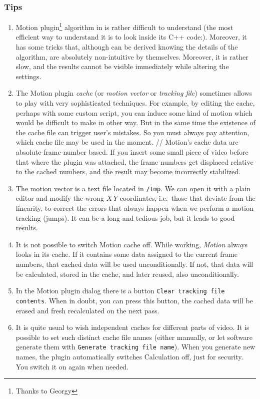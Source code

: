 \subsubsection*{Tips}
\label{ssub:tips}

\begin{enumerate}
    \item Motion plugin\protect\footnote{Thanks to Georgy} algorithm in \CGG{} is rather difficult to understand (the most efficient way to understand it is to look inside its C++ code:). Moreover, it has some tricks that, although can be derived knowing the details of the algorithm, are absolutely non-intuitive by themselves. Moreover, it is rather slow, and the results cannot be visible immediately while altering the settings.
    \item The Motion plugin \textit{cache} (or\textit{ motion vector} or \textit{tracking file}) sometimes allows to play with very sophisticated techniques. For example, by editing the cache, perhaps with some custom script, you can induce some kind of motion which would be difficult to make in other way. But in the same time the existence of the cache file can trigger user's mistakes. So you must always pay attention, which cache file may be used in the moment. //
    Motion's cache data are absolute-frame-number based. If you insert some small piece of video before that where the plugin was attached, the frame numbers get displaced relative to the cached numbers, and the result may become incorrectly stabilized.
    \item The motion vector is a text file located in \texttt{/tmp}. We can open it with a plain editor and modify the wrong $X\,Y$ coordinates, i.e.\ those that deviate from the linearity, to correct the errors that always happen when we perform a motion tracking (jumps). It can be a long and tedious job, but it leads to good results.
    \item It is not possible to switch Motion cache off. While working, \textit{Motion} always looks in its cache. If it contains some data assigned to the current frame numbers, that cached data will be used unconditionally. If not, that data will be calculated, stored in the cache, and later reused, also unconditionally.
    \item In the Motion plugin dialog there is a button \texttt{Clear tracking file contents}. When in doubt, you can press this button, the cached data will be erased and fresh recalculated on the next pass.
    \item It is quite usual to wish independent caches for different parts of video. It is possible to set such distinct cache file names (either manually, or let software generate them with \texttt{Generate tracking file name}). When you generate new names, the plugin automatically switches Calculation off, just for security. You switch it on again when needed.

\end{enumerate}
